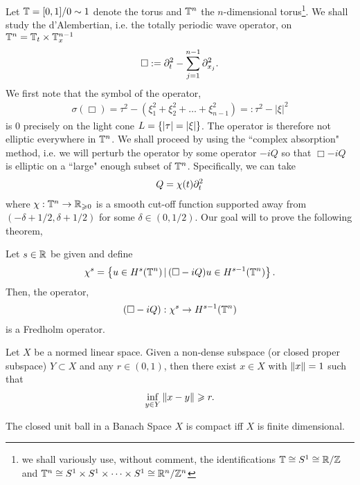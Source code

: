 \documentclass{article}
\title{}
\date{}
\begin{document}
Let $\T = [0,1] / 0 \sim 1$ denote the torus and $\T^n$ the $n$-dimensional torus\footnote{we shall variously use, without comment, the identifications $\T \cong S^1 \cong \R / \Z$ and $\T^n \cong S^1 \times S^1 \times \dots \times S^1 \cong \R^n / \Z^n$}. We shall study the d'Alembertian, i.e. the totally periodic wave operator, on $\T^n = \T_t \times \T_x^{n - 1}$ 
\begin{align}\label{eq: d'Alembertian}
\Box := \p_t^2 - \sum_{j = 1}^{n -1} \p_{x_j}^2. 
\end{align}
We first note that the symbol of the operator, 
\begin{align*}
\sigma(\Box) = \tau^2 - (\xi_1^2 + \xi_2^2 + \dots + \xi_{n -1}^2) =: \tau^2 - |\xi|^2
\end{align*}
is $0$ precisely on the light cone $L = \set{|\tau| = |\xi|}$. The operator is therefore not elliptic everywhere in $\T^n$.  We shall proceed by using the ``complex absorption" method, i.e. we will perturb the operator by some operator $-iQ$ so that $\Box - iQ$ is elliptic on a ``large" enough subset of $\T^n$. Specifically, we can take 
\begin{align}\label{eq: perturbation operator}
Q = \chi(t)\p_t^2
\end{align}
where $\chi: \T^n \to \R_{\geq 0}$ is a smooth cut-off function supported away from $(-\delta + 1/2, \delta + 1/2)$ for some $\delta \in (0, 1/2)$. Our goal will to prove the following theorem, 
\begin{ftheorem}
Let $s \in \R$ be given and define 
\begin{align*}
\chi^s = \set{u \in H^s(\T^n) \wh (\Box - i Q)u \in H^{s - 1}(\T^n)}. 
\end{align*}
Then, the operator, 
\begin{align*}
(\Box - iQ): \chi^s \to H^{s - 1}(\T^n)
\end{align*}
is a Fredholm operator. 
\end{ftheorem}


\begin{flemma}
Let $X$ be a normed linear space. Given a non-dense subspace (or closed proper subspace) $Y \subset X$ and any $r \in (0, 1)$, then there exist $x \in X$ with $\norm[x] = 1$ such that 
\begin{align*}
\inf_{y \in Y} \norm[x - y] \geq r. 
\end{align*}
\end{flemma}

\begin{mdframed}
\begin{cor}
The closed unit ball in a Banach Space $X$ is compact iff $X$ is finite dimensional. 
\end{cor}
\end{mdframed}
\end{document}
